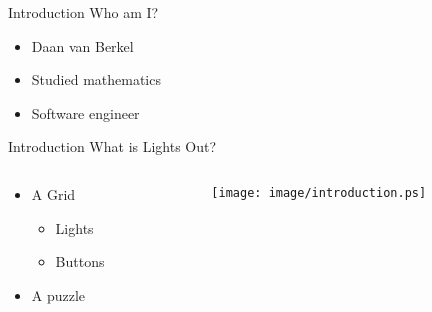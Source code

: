 \begin{frame}{Introduction}
	Who am I?
	\begin{itemize}
		\item Daan van Berkel
		\item Studied mathematics
		\item Software engineer
	\end{itemize}
\end{frame}

\begin{frame}{Introduction}
	What is Lights Out?
	\begin{columns}[T]
		\begin{column}{0.45\textwidth}
			\begin{itemize}
				\item A Grid
				\begin{itemize}
					\item Lights
					\item Buttons
				\end{itemize}
				\item A puzzle
			\end{itemize}
		\end{column}
		
		\begin{column}{0.45\textwidth}
			\centerline{\texttt{[image: image/introduction.ps]}}
		\end{column}
	\end{columns}
\end{frame}
